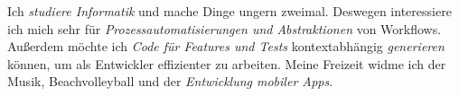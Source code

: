 Ich \emph{studiere Informatik} und mache Dinge ungern zweimal. Deswegen interessiere ich mich sehr für \emph{Prozessautomatisierungen und Abstraktionen} von Workflows. Außerdem möchte ich \emph{Code für Features und Tests} kontextabhängig \emph{generieren} können, um als Entwickler effizienter zu arbeiten. Meine Freizeit widme ich der Musik, Beachvolleyball und der \emph{Entwicklung mobiler Apps}.